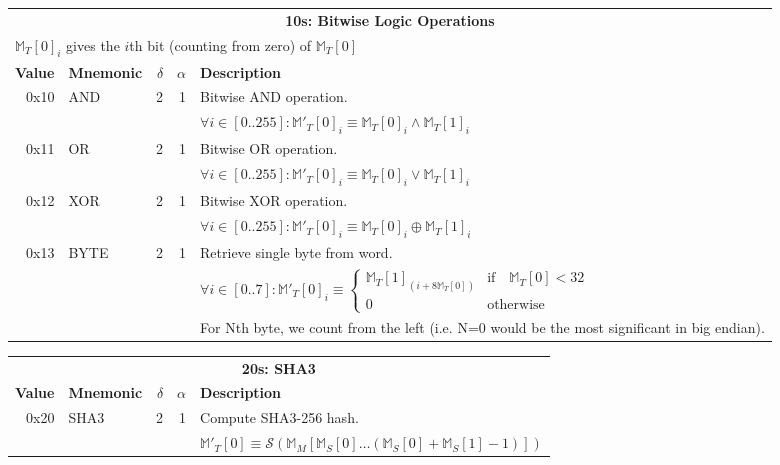 \documentclass[9pt,oneside]{amsart}
\begin{document}
\begin{tabular*}{\columnwidth}[h]{rlrrl}
\toprule
\multicolumn{5}{c}{\textbf{10s: Bitwise Logic Operations}} \\
\multicolumn{5}{l}{$\mathbb{M}_T[0]_i$ gives the $i$th bit (counting from zero) of $\mathbb{M}_T[0]$} \vspace{5pt} \\
\textbf{Value} & \textbf{Mnemonic} & $\delta$ & $\alpha$ & \textbf{Description} \vspace{5pt} \\
0x10 & {\small AND} & 2 & 1 & Bitwise AND operation. \\
&&&& $\forall i \in [0..255]: \mathbb{M}'_T[0]_i \equiv \mathbb{M}_T[0]_i \wedge \mathbb{M}_T[1]_i$ \\
\midrule
0x11 & {\small OR} & 2 & 1 & Bitwise OR operation. \\
&&&& $\forall i \in [0..255]: \mathbb{M}'_T[0]_i \equiv \mathbb{M}_T[0]_i \vee \mathbb{M}_T[1]_i$ \\
\midrule
0x12 & {\small XOR} & 2 & 1 & Bitwise XOR operation. \\
&&&& $\forall i \in [0..255]: \mathbb{M}'_T[0]_i \equiv \mathbb{M}_T[0]_i \oplus \mathbb{M}_T[1]_i$ \\
\midrule
0x13 & {\small BYTE} & 2 & 1 & Retrieve single byte from word. \\
&&&& $\forall i \in [0..7]: \mathbb{M}'_T[0]_i \equiv \begin{cases} \mathbb{M}_T[1]_{(i + 8\mathbb{M}_T[0])} & \text{if} \quad \mathbb{M}_T[0] < 32 \\ 0 & \text{otherwise} \end{cases} $\\
&&&& For Nth byte, we count from the left (i.e. N=0 would be the most significant in big endian). \\
\bottomrule
\end{tabular*}

\begin{tabular*}{\columnwidth}[h]{rlrrl}
\toprule
\multicolumn{5}{c}{\textbf{20s: SHA3}} \vspace{5pt} \\
\textbf{Value} & \textbf{Mnemonic} & $\delta$ & $\alpha$ & \textbf{Description} \vspace{5pt} \\
0x20 & {\small SHA3} & 2 & 1 & Compute SHA3-256 hash. \\
&&&& $\mathbb{M}'_T[0] \equiv \mathcal{S}(\mathbb{M}_M[ \mathbb{M}_S[0] \dots (\mathbb{M}_S[0] + \mathbb{M}_S[1] - 1) ])$ \\
\bottomrule
\end{tabular*}
\end{document}
